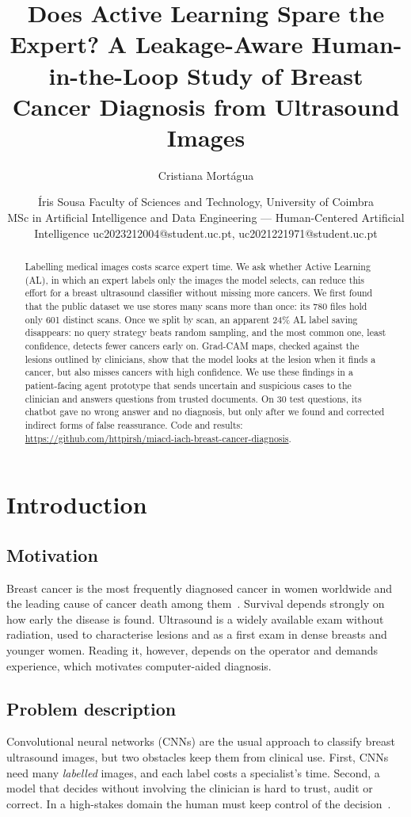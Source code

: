 \documentclass{article}
\title{Does Active Learning Spare the Expert? A Leakage-Aware Human-in-the-Loop Study of Breast Cancer Diagnosis from Ultrasound Images}
\author{
    Cristiana Mortágua \and Íris Sousa
    \affiliations
    Faculty of Sciences and Technology, University of Coimbra\\
    MSc in Artificial Intelligence and Data Engineering --- Human-Centered Artificial Intelligence
    \emails
    uc2023212004@student.uc.pt, uc2021221971@student.uc.pt
}
\begin{document}
\maketitle

\begin{abstract}
Labelling medical images costs scarce expert time. We ask whether Active Learning (AL), in
which an expert labels only the images the model selects, can reduce this effort for a
breast ultrasound classifier without missing more cancers. We first found that the public
dataset we use stores many scans more than once: its 780 files hold only 601 distinct
scans. Once we split by scan, an apparent 24\% AL label saving disappears: no query
strategy beats random sampling, and the most common one, least confidence, detects fewer
cancers early on. Grad-CAM maps, checked against the
lesions outlined by clinicians, show that the model looks at the lesion when it finds a
cancer, but also misses cancers with high confidence. We use these findings in a
patient-facing agent prototype that sends uncertain and suspicious cases to the clinician
and answers questions from trusted documents. On 30 test questions, its chatbot gave no
wrong answer and no diagnosis, but only after we found and corrected indirect forms of false
reassurance. Code and results:
\url{https://github.com/httpirsh/miacd-iach-breast-cancer-diagnosis}.
\end{abstract}

\section{Introduction}

\subsection{Motivation}
Breast cancer is the most frequently diagnosed cancer in women worldwide and the leading
cause of cancer death among them~\cite{bray2024globocan}. Survival depends strongly on how early the disease
is found. Ultrasound is a widely available exam without radiation, used to characterise
lesions and as a first exam in dense breasts and younger women. Reading it, however,
depends on the operator and demands experience, which motivates computer-aided diagnosis.

\subsection{Problem description}
Convolutional neural networks (CNNs) are the usual approach to classify breast ultrasound
images, but two obstacles keep them from clinical use. First, CNNs need many \emph{labelled} images, and each label
costs a specialist's time. Second, a model that decides without involving the clinician is
hard to trust, audit or correct. In a high-stakes domain the human must keep control of
the decision~\cite{shneiderman2020hcai}.
\end{document}
